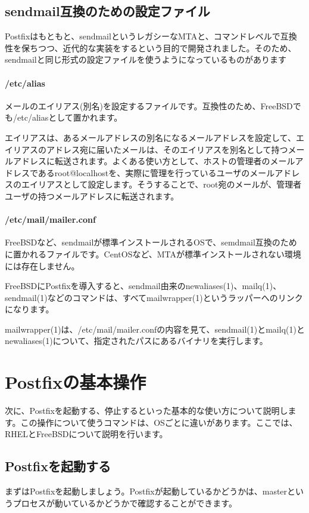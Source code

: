 \subsection{sendmail互換のための設定ファイル}
Postfixはもともと、sendmailというレガシーなMTAと、コマンドレベルで互換性を保ちつつ、近代的な実装をするという目的で開発されました。そのため、sendmailと同じ形式の設定ファイルを使うようになっているものがあります

\paragraph{/etc/alias}
メールのエイリアス(別名)を設定するファイルです。互換性のため、FreeBSDでも/etc/aliasとして置かれます。

エイリアスは、あるメールアドレスの別名になるメールアドレスを設定して、エイリアスのアドレス宛に届いたメールは、そのエイリアスを別名として持つメールアドレスに転送されます。よくある使い方として、ホストの管理者のメールアドレスであるroot@localhostを、実際に管理を行っているユーザのメールアドレスのエイリアスとして設定します。そうすることで、root宛のメールが、管理者ユーザの持つメールアドレスに転送されます。

\paragraph{/etc/mail/mailer.conf}
FreeBSDなど、sendmailが標準インストールされるOSで、semdmail互換のために置かれるファイルです。CentOSなど、MTAが標準インストールされない環境には存在しません。

FreeBSDにPostfixを導入すると、sendmail由来のnewaliases(1)、mailq(1)、sendmail(1)などのコマンドは、すべてmailwrapper(1)というラッパーへのリンクになります。

mailwrapper(1)は、/etc/mail/mailer.confの内容を見て、sendmail(1)とmailq(1)とnewaliases(1)について、指定されたパスにあるバイナリを実行します。


\section{Postfixの基本操作}
次に、Postfixを起動する、停止するといった基本的な使い方について説明します。この操作について使うコマンドは、OSごとに違いがあります。ここでは、RHELとFreeBSDについて説明を行います。

\subsection{Postfixを起動する}
まずはPostfixを起動しましょう。Postfixが起動しているかどうかは、masterというプロセスが動いているかどうかで確認することができます。

